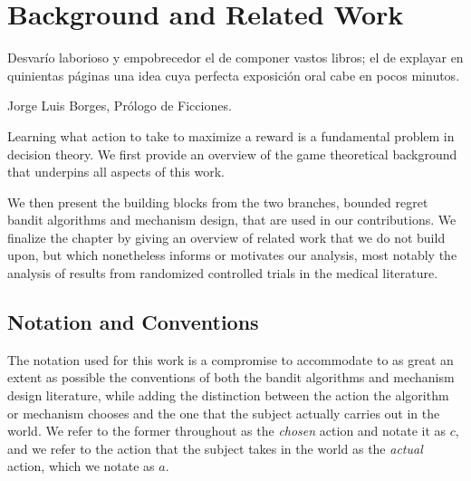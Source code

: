 \chapter{Background and Related Work}
\label{cha:background}

\epigraph{Desvar\'io laborioso y empobrecedor el de componer vastos libros; el de explayar en quinientas p\'aginas una idea cuya perfecta exposici\'on oral cabe en pocos minutos.}{Jorge Luis Borges, Pr\'ologo de Ficciones.}




Learning what action to take to maximize a reward is a fundamental problem in decision theory.
We first provide an overview of the game theoretical background that underpins all aspects of this work.

We then present the building blocks from the two branches, bounded regret bandit algorithms and mechanism design, that are used in our contributions.
We finalize the chapter by giving an overview of related work that we do not build upon, but which nonetheless informs or motivates our analysis, most notably the analysis of results from randomized controlled trials in the medical literature. 

\section{Notation and Conventions}


The notation used for this work is a compromise to accommodate to as great an extent as possible the conventions of both the bandit algorithms and mechanism design literature, while adding the distinction between the action the algorithm or mechanism chooses and the one that the subject actually carries out in the world. We refer to the former throughout as the \emph{chosen} action and notate it as $c$, and we refer to the action that the subject takes in the world as the \emph{actual} action, which we notate as $a$.

